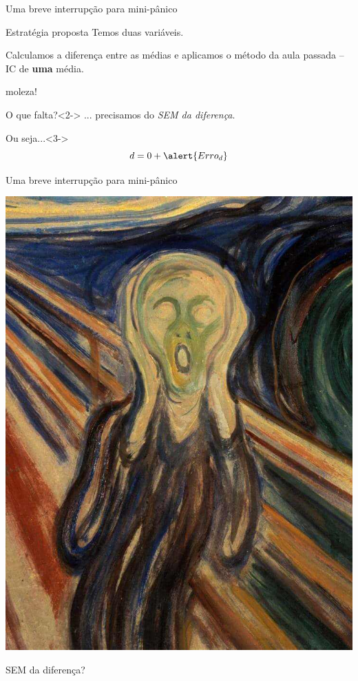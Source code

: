 \documentclass{beamer}
\begin{document}
\begin{frame}{Uma breve interrupção para mini-pânico}
  \begin{block}{Estratégia proposta}
    Temos duas variáveis.

    \bigskip
    Calculamos a \alert{diferença} entre as médias e aplicamos o método da aula passada -- IC de {\bf uma} média.

    \begin{center}
      moleza!
    \end{center}
  \end{block}
  \begin{block}{O que falta?}<2->
    ... precisamos do {\em SEM da diferença}.
  \end{block}
  \begin{block}{Ou seja...}<3->
    \begin{displaymath}
      d = 0 + \alert{Erro_d}
    \end{displaymath}
  \end{block}

\end{frame}

\begin{frame}{Uma breve interrupção para mini-pânico}
  \begin{center}
    \includegraphics[height=.7\textheight]{Cap7/ogrito}
  \end{center}
  \begin{block}{}
    \begin{center}
      SEM da diferença?
    \end{center}
  \end{block}
\end{frame}
\end{document}
